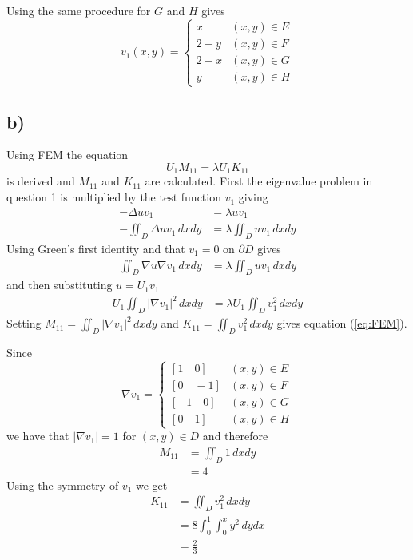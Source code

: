     Using the same procedure for $G$ and $H$ gives
    \begin{equation*}
        v_1(x,y) = \begin{cases}
            x & (x,y)\in E \\
            2-y & (x,y)\in F \\
            2-x & (x,y)\in G \\
            y & (x,y)\in H
        \end{cases}
    \end{equation*}

    \subsection*{b)}

    Using FEM the equation
    \begin{equation}\label{eq:FEM}
        U_1M_{11} = \lambda U_1K_{11}
    \end{equation}
    is derived and $M_{11}$ and $K_{11}$ are calculated. First the eigenvalue problem in question 1 is multiplied by the test function $v_1$ giving
    \begin{align*}
        -\Delta uv_1 &= \lambda uv_1 \\
        -\iint_D \Delta uv_1\, dxdy &= \lambda\iint_D uv_1\, dxdy
    \end{align*}
    Using Green's first identity and that $v_1=0$ on $\partial D$ gives
    \begin{align*}
        \iint_D \nabla u \nabla v_1\, dxdy &= \lambda\iint_D uv_1\, dxdy
    \end{align*}
    and then substituting $u = U_1v_1$
    \begin{align*}
        U_1\iint_D |\nabla v_1|^2 \, dxdy &= \lambda U_1\iint_D v_1^2\, dxdy
    \end{align*}
    Setting $M_{11}=\iint_D |\nabla v_1|^2 \, dxdy$ and $K_{11}=\iint_D v_1^2\, dxdy$ gives equation (\ref{eq:FEM}).

    Since
    \begin{equation*}
        \nabla v_1 = \begin{cases}
            [1 \quad 0] & (x,y)\in E \\
            [0 \quad -1] & (x,y)\in F \\
            [-1 \quad 0] & (x,y)\in G \\
            [0 \quad 1] & (x,y)\in H
        \end{cases}
    \end{equation*}
    we have that $|\nabla v_1|=1$ for $(x,y)\in D$ and therefore
    \begin{align*}
        M_{11} &= \iint_D 1 \, dxdy \\
        &= 4
    \end{align*}
    Using the symmetry of $v_1$ we get
    \begin{align*}
        K_{11} &= \iint_D v_1^2\, dxdy \\
        &= 8\int_0^1\int_0^x y^2\, dydx \\
        &= \frac{2}{3}
    \end{align*}

